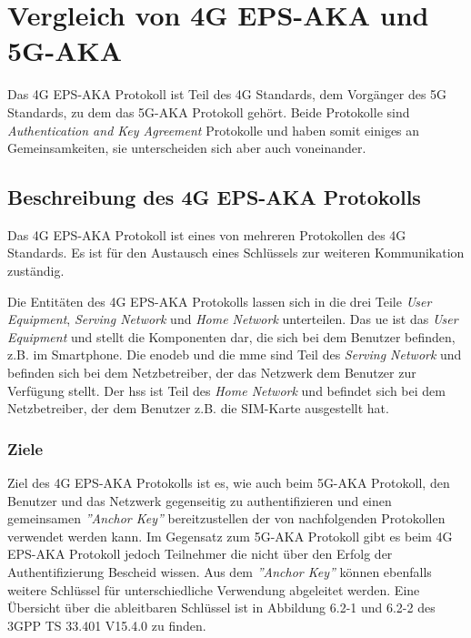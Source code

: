 \chapter{Vergleich von 4G EPS-AKA und 5G-AKA}
\label{chap:3}

Das 4G EPS-AKA Protokoll ist Teil des 4G Standards, dem Vorgänger des 5G Standards, zu dem das 5G-AKA Protokoll gehört.
Beide Protokolle sind \textit{Authentication and Key Agreement} Protokolle und haben somit einiges an Gemeinsamkeiten, sie unterscheiden sich aber auch voneinander.

\section{Beschreibung des 4G EPS-AKA Protokolls}

Das 4G EPS-AKA Protokoll ist eines von mehreren Protokollen des 4G Standards.
Es ist für den Austausch eines Schlüssels zur weiteren Kommunikation zuständig.

Die Entitäten des 4G EPS-AKA Protokolls lassen sich in die drei Teile \textit{User Equipment}, \textit{Serving Network} und \textit{Home Network} unterteilen.
Das \gls{ue} ist das \textit{User Equipment} und stellt die Komponenten dar, die sich bei dem Benutzer befinden, z.B. im Smartphone.
Die \gls{enodeb} und die \gls{mme} sind Teil des \textit{Serving Network} und befinden sich bei dem Netzbetreiber, der das Netzwerk dem Benutzer zur Verfügung stellt.
Der \gls{hss} ist Teil des \textit{Home Network} und befindet sich bei dem Netzbetreiber, der dem Benutzer z.B. die SIM-Karte ausgestellt hat. %

\subsection{Ziele}

Ziel des 4G EPS-AKA Protokolls ist es, wie auch beim 5G-AKA Protokoll, den Benutzer und das Netzwerk gegenseitig zu authentifizieren und einen gemeinsamen \textit{''Anchor Key''} bereitzustellen der von nachfolgenden Protokollen verwendet werden kann.
Im Gegensatz zum 5G-AKA Protokoll gibt es beim 4G EPS-AKA Protokoll jedoch Teilnehmer die nicht über den Erfolg der Authentifizierung Bescheid wissen.
Aus dem \textit{''Anchor Key''} können ebenfalls weitere Schlüssel für unterschiedliche Verwendung abgeleitet werden.
Eine Übersicht über die ableitbaren Schlüssel ist in Abbildung 6.2-1 und 6.2-2 des 3GPP TS 33.401 V15.4.0 zu finden. %

